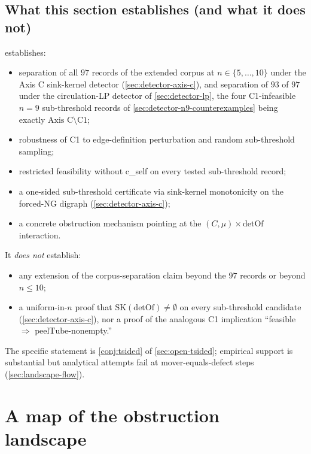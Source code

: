 \documentclass[11pt,a4paper]{article}
\theoremstyle{plain}
\theoremstyle{definition}
\newcommand{\SK}{\mathrm{SK}}
\newcommand{\detOf}{\mathrm{detOf}}
\newcommand{\peelTube}{\mathrm{peelTube}}
\begin{document}
\subsection{What this section establishes (and what it does not)}\label{sec:detector-summary}

 establishes:
\begin{itemize}[leftmargin=*]
\item separation of all $97$ records of the extended corpus at
$n \in \{5, \ldots, 10\}$ under the Axis C sink-kernel detector
(\cref{sec:detector-axis-c}), and separation of $93$ of $97$ under
the circulation-LP detector of \cref{sec:detector-lp}, the four
C1-infeasible $n = 9$ sub-threshold records of
\cref{sec:detector-n9-counterexamples} being exactly
$\text{Axis C} \setminus \text{C1}$;
\item robustness of C1 to edge-definition perturbation and random sub-threshold sampling;
\item restricted feasibility without c\_self on every tested sub-threshold record;
\item a one-sided sub-threshold certificate via sink-kernel monotonicity
on the forced-NG digraph (\cref{sec:detector-axis-c});
\item a concrete obstruction mechanism pointing at the
$(C, \mu) \times \detOf$ interaction.
\end{itemize}
It \emph{does not} establish:
\begin{itemize}[leftmargin=*]
\item any extension of the corpus-separation claim beyond the $97$
records or beyond $n \le 10$;
\item a uniform-in-$n$ proof that $\SK(\detOf) \ne \emptyset$ on every
sub-threshold candidate (\cref{sec:detector-axis-c}), nor a proof of
the analogous C1 implication ``feasible $\Rightarrow$ $\peelTube$-nonempty.''
\end{itemize}

The specific statement is \cref{conj:tsided} of
\cref{sec:open-tsided}; empirical support is substantial but
analytical attempts fail at mover-equals-defect steps
(\cref{sec:landscape-flow}).

\section{A map of the obstruction landscape}\label{sec:landscape}
\end{document}
